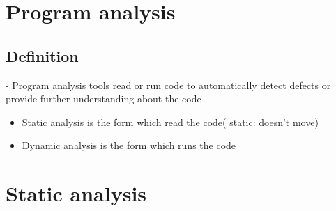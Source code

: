 \documentclass{article}
\begin{document}
 \section{Program analysis}
 \subsection{Definition}
 - Program analysis  tools read or run code to automatically detect defects or
 provide further understanding about the code
 \begin{itemize}
   \item Static analysis is the form which read the code( static: doesn't move)
   \item Dynamic analysis is the form which runs the code
 \end{itemize}
 
 
 \section{ Static analysis}
 
 
 
\end{document}
